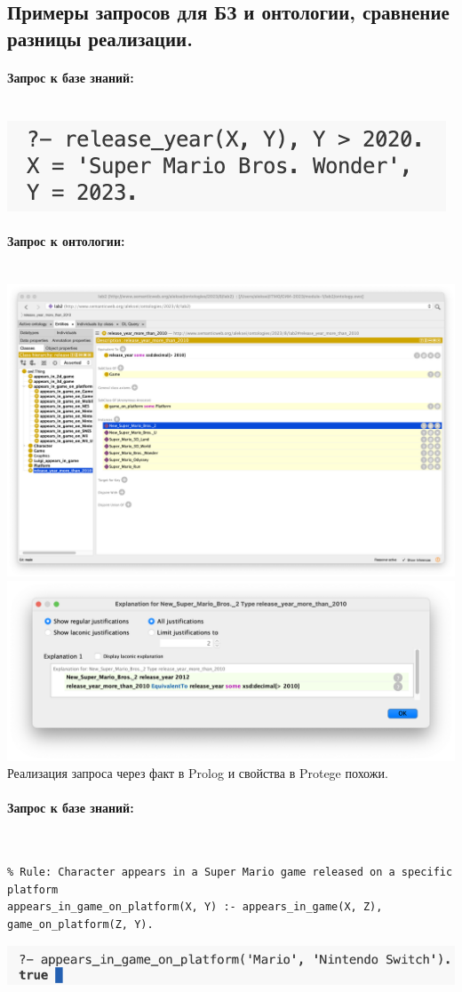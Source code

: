 \documentclass[12pt,onecolumn]{article}
\newcommand{\nparagraph}[1]{\paragraph{#1}\mbox{}\\}
\begin{document}
\subsection{Примеры запросов для БЗ и онтологии, сравнение разницы реализации.}
\nparagraph{Запрос к базе знаний:}
\includegraphics[width=\textwidth]{image/prolog-test-4.png}
\nparagraph{Запрос к онтологии:}
\includegraphics[width=\textwidth]{image/ontology-test-3.png}
\includegraphics[width=\textwidth]{image/ontology-test-4.png}
Реализация запроса через факт в Prolog и свойства в Protege похожи.
\nparagraph{Запрос к базе знаний:}
\begin{verbatim}
% Rule: Character appears in a Super Mario game released on a specific platform
appears_in_game_on_platform(X, Y) :- appears_in_game(X, Z), game_on_platform(Z, Y).
\end{verbatim}
\includegraphics[width=\textwidth]{image/prolog-test-3.png}
\end{document}
